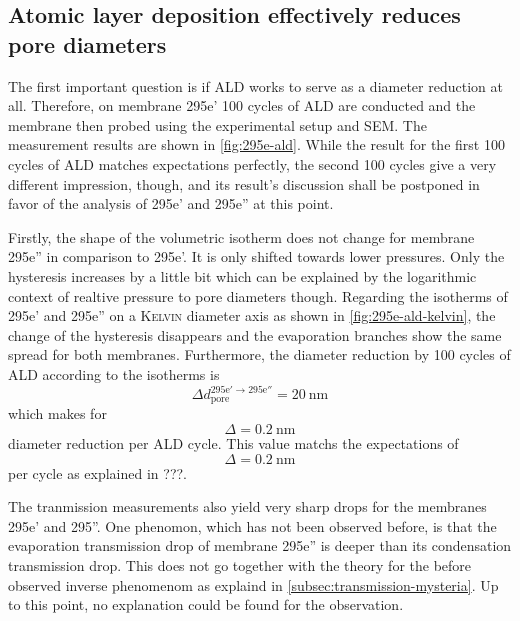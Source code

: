 \documentclass[../thesis.tex]{subfiles}
\begin{document}
        

        \subsection{Atomic layer deposition effectively reduces pore diameters}
        \label{subsec:ald-reduces-diameters}

          The first important question is if ALD works to serve as a diameter reduction at all. Therefore, on membrane 295e' 100 cycles of ALD are conducted and the membrane then probed using the experimental setup and SEM. The measurement results are shown in \cref{fig:295e-ald}. While the result for the first 100 cycles of ALD matches expectations perfectly, the second 100 cycles give a very different impression, though, and its result's discussion shall be postponed in favor of the analysis of 295e' and 295e'' at this point.

          Firstly, the shape of the volumetric isotherm does not change for membrane 295e'' in comparison to 295e'. It is only shifted towards lower pressures. Only the hysteresis increases by a little bit which can be explained by the logarithmic context of realtive pressure to pore diameters though. Regarding the isotherms of 295e' and 295e'' on a \textsc{Kelvin} diameter axis as shown in \cref{fig:295e-ald-kelvin}, the change of the hysteresis disappears and the evaporation branches show the same spread for both membranes. Furthermore, the diameter reduction by 100 cycles of ALD according to the isotherms is
          \begin{equation}
            \Delta d_\mathrm{pore}^\mathrm{295e'\rightarrow 295e''}=\SI{20}{\nano\meter}
          \end{equation}
          which makes for
          \begin{equation}
            \Delta =\SI{0,2}{\nano\meter}
          \end{equation}
          diameter reduction per ALD cycle. This value matchs the expectations of
          \begin{equation}
            \Delta = \SI{0,2}{\nano\meter}
          \end{equation}
          per cycle as explained in ???.

          The tranmission measurements also yield very sharp drops for the membranes 295e' and 295''. One phenomon, which has not been observed before, is that the evaporation transmission drop of membrane 295e'' is deeper than its condensation transmission drop. This does not go together with the theory for the before observed inverse phenomenom as explaind in \cref{subsec:transmission-mysteria}. Up to this point, no explanation could be found for the observation.
\end{document}
